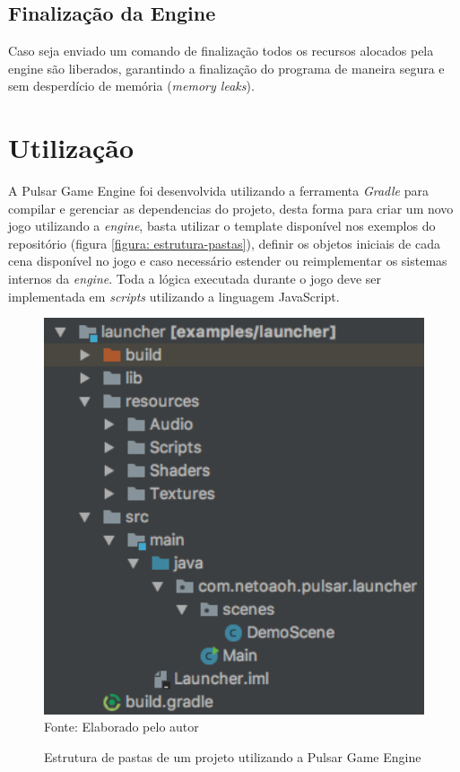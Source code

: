 \documentclass[12pt,	openright, twoside,	a4paper, english, french, spanish, brazil]{abntex2}
\begin{document}
\subsection{Finalização da Engine}
Caso seja enviado um comando de finalização todos os recursos alocados pela engine são liberados, garantindo a finalização do programa de maneira segura e sem desperdício de memória (\textit{memory leaks}). \\


%
%

\section{Utilização}

A Pulsar Game Engine foi desenvolvida utilizando a ferramenta \textit{Gradle} para compilar e gerenciar as dependencias do projeto, desta forma para criar um novo jogo utilizando a \textit{engine}, basta utilizar o template disponível nos exemplos do repositório (figura \ref{figura: estrutura-pastas}), definir os objetos iniciais de cada cena disponível no jogo e caso necessário estender ou reimplementar os sistemas internos da \textit{engine}. Toda a lógica executada durante o jogo deve ser implementada em \textit{scripts} utilizando a linguagem JavaScript.

\begin{figure}[H]
\centering
\caption{Estrutura de pastas de um projeto utilizando a Pulsar Game Engine}
\includegraphics[width=12cm]{imagens/estrutura-pastas.png}
\\
\small{Fonte: Elaborado pelo autor}
\label{figura:estrutura-pastas}
\end{figure}
\end{document}
